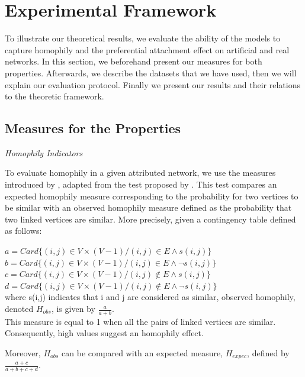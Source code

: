 \section{Experimental Framework}

To illustrate our theoretical results, we evaluate the ability of the models to capture homophily and the preferential attachment effect on artificial and real networks. In this section, we beforehand present our measures for both properties. Afterwards, we describe the datasets that we have used, then we will explain our evaluation protocol. Finally we present our results and their relations to the theoretic framework.

\subsection{Measures for the Properties}

\textit{Homophily Indicators}

To evaluate homophily in a given attributed network, we use the measures introduced by \cite{largeron2015}, adapted from the test proposed by \cite{Easley2010}.  This test compares an expected homophily measure corresponding to the probability for two vertices to be similar with an observed homophily measure defined as the probability that two linked vertices are similar. More precisely, given a contingency table defined as follows:

$a = Card\{(i,j)\in V\times (V-1) / (i,j) \in E \land s(i,j)\}$\\
$b = Card\{(i,j)\in V\times (V-1) / (i,j) \in E \land \neg{s(i,j)}\}$\\ 
$c = Card\{(i,j)\in V\times (V-1) / (i,j) \notin E \land s(i,j)\}$\\
$d = Card\{(i,j)\in V\times (V-1) / (i,j) \notin E \land \neg{s(i,j)}\}$\\

where  s(i,j) indicates that i and j are considered as similar, observed homophily, denoted $H_{obs}$, is given by $\frac{a}{a+b}$.\\
This measure  is equal to 1 when all the pairs of linked vertices are similar. Consequently, high values suggest an homophily effect.

Moreover, $H_{obs}$ can be compared with an expected measure, $H_{expec}$, defined by  $ \frac{a+c}{a+b+c+d}$.\\

